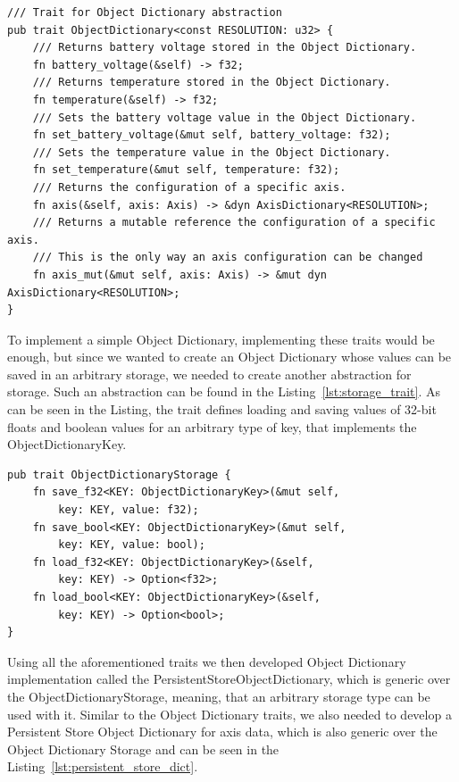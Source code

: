 \begin{lstlisting}[caption={Trait for abstracting away the Object Dictionary.},label=lst:od_trait]
/// Trait for Object Dictionary abstraction
pub trait ObjectDictionary<const RESOLUTION: u32> {
    /// Returns battery voltage stored in the Object Dictionary.
    fn battery_voltage(&self) -> f32;
    /// Returns temperature stored in the Object Dictionary.
    fn temperature(&self) -> f32;
    /// Sets the battery voltage value in the Object Dictionary.
    fn set_battery_voltage(&mut self, battery_voltage: f32);
    /// Sets the temperature value in the Object Dictionary.
    fn set_temperature(&mut self, temperature: f32);
    /// Returns the configuration of a specific axis.
    fn axis(&self, axis: Axis) -> &dyn AxisDictionary<RESOLUTION>;
    /// Returns a mutable reference the configuration of a specific axis.
    /// This is the only way an axis configuration can be changed
    fn axis_mut(&mut self, axis: Axis) -> &mut dyn AxisDictionary<RESOLUTION>;
}
\end{lstlisting}

To implement a simple Object Dictionary, implementing these traits would be enough, but since we wanted to create an Object Dictionary whose values can be saved in an arbitrary storage, we needed to create another abstraction for storage.
Such an abstraction can be found in the Listing~\ref{lst:storage_trait}.
As can be seen in the Listing, the trait defines loading and saving values of 32-bit floats and boolean values for an arbitrary type of key, that implements the ObjectDictionaryKey.

\begin{lstlisting}[caption={Trait for abstracting away the Object Dictionary storage.},label=lst:storage_trait]
pub trait ObjectDictionaryStorage {
    fn save_f32<KEY: ObjectDictionaryKey>(&mut self,
        key: KEY, value: f32);
    fn save_bool<KEY: ObjectDictionaryKey>(&mut self,
        key: KEY, value: bool);
    fn load_f32<KEY: ObjectDictionaryKey>(&self,
        key: KEY) -> Option<f32>;
    fn load_bool<KEY: ObjectDictionaryKey>(&self,
        key: KEY) -> Option<bool>;
}
\end{lstlisting}

Using all the aforementioned traits we then developed Object Dictionary implementation called the PersistentStoreObjectDictionary, which is generic over the ObjectDictionaryStorage, meaning, that an arbitrary storage type can be used with it.
Similar to the Object Dictionary traits, we also needed to develop a Persistent Store Object Dictionary for axis data, which is also generic over the Object Dictionary Storage and can be seen in the Listing~\ref{lst:persistent_store_dict}.

